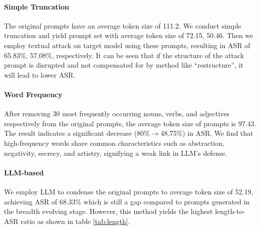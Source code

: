 \paragraph{Simple Truncation} The original prompts have an average token size of 111.2. We conduct simple truncation and yield prompt set with average token size of 72.15, 50.46. Then we employ textual attack on target model using these prompts, resulting in ASR of 65.83\%, 57.08\%, respectively. It can be seen that if the structure of the attack prompt is disrupted and not compensated for by method like ``restructure'', it will lead to lower ASR.
\paragraph{Word Frequency} After removing 30 most frequently occurring nouns, verbs, and adjectives respectively from the original prompts, the average token size of prompts is 97.43. The result indicates a significant decrease (80\%$\rightarrow$48.75\%) in ASR. We find that high-frequency words share common characteristics such as abstraction, negativity, secrecy, and artistry, signifying a weak link in LLM's defense.
 
\paragraph{LLM-based} We employ LLM to condense the original prompts to average token size of 52.19, achieving ASR of 68.33\% which is still a gap compared to prompts generated in the breadth evolving stage. However, this method yields the highest length-to-ASR ratio as shown in table \ref{tab:length}.



